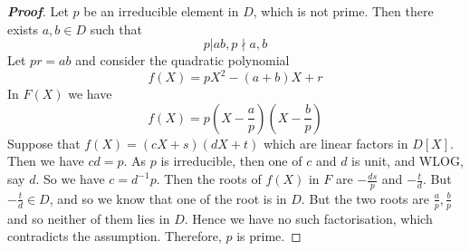 \begin{proof}[\bf Proof] Let $p$ be an irreducible element in $D$, which is not prime. Then there exists $a,b \in D$ such that
$$p|ab, p \nmid a,b$$
Let $pr=ab$ and consider the quadratic polynomial
$$f(X)=pX^2-(a+b)X+r$$
In $F(X)$ we have
$$f(X)=p\left(X-\frac{a}{p}\right)\left(X-\frac{b}{p}\right)$$
Suppose that $f(X)=(cX+s)(dX+t)$ which are linear factors in $D[X]$. Then we have $cd=p$. As $p$ is irreducible, then one of $c$ and $d$ is unit, and WLOG, say $d$. So we have $c=d^{-1}p$. Then the roots of $f(X)$ in $F$ are $-\frac{ds}{p}$ and $-\frac{t}{d}$. But $-\frac{t}{d} \in D$, and so we know that one of the root is in $D$. But the two roots are $\frac{a}{p},\frac{b}{p}$ and so neither of them lies in $D$. Hence we have no such factorisation, which contradicts the assumption. Therefore, $p$ is prime.
\end{proof}

